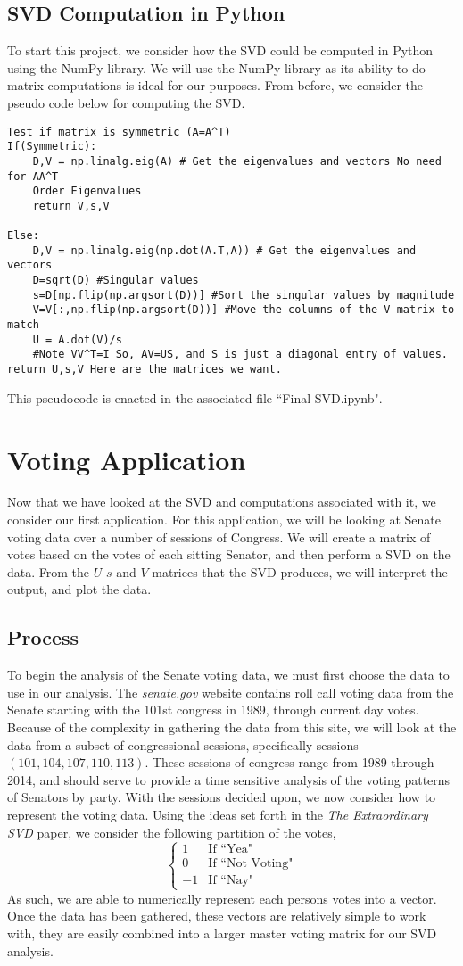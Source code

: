 \documentclass[letterpaper,12pt]{article}
\begin{document}
\subsection{SVD Computation in Python}
To start this project, we consider how the SVD could be computed in Python using the NumPy library. We will use the NumPy library as its ability to do matrix computations is ideal for our purposes. From before, we consider the pseudo code below for computing the SVD.
\begin{verbatim}
Test if matrix is symmetric (A=A^T)
If(Symmetric):
    D,V = np.linalg.eig(A) # Get the eigenvalues and vectors No need for AA^T
    Order Eigenvalues
    return V,s,V
	
Else:
    D,V = np.linalg.eig(np.dot(A.T,A)) # Get the eigenvalues and vectors
    D=sqrt(D) #Singular values
    s=D[np.flip(np.argsort(D))] #Sort the singular values by magnitude
    V=V[:,np.flip(np.argsort(D))] #Move the columns of the V matrix to match
    U = A.dot(V)/s 
    #Note VV^T=I So, AV=US, and S is just a diagonal entry of values.
return U,s,V Here are the matrices we want.
\end{verbatim}
This pseudocode is enacted in the associated file ``Final SVD.ipynb".
\section{Voting Application}
Now that we have looked at the SVD and computations associated with it, we consider our first application. For this application, we will be looking at Senate voting data over a number of sessions of Congress. We will create a matrix of votes based on the votes of each sitting Senator, and then perform a SVD on the data. From the $U$ $s$ and $V$ matrices that the SVD produces, we will interpret the output, and plot the data.
\subsection{Process}
To begin the analysis of the Senate voting data, we must first choose the data to use in our analysis. The \textit{senate.gov} website contains roll call voting data from the Senate starting with the 101st congress in 1989, through current day votes. Because of the complexity in gathering the data from this site, we will look at the data from a subset of congressional sessions, specifically sessions $(101,104,107,110,113)$. These sessions of congress range from 1989 through 2014, and should serve to provide a time sensitive analysis of the voting patterns of Senators by party.  With the sessions decided upon, we now consider how to represent the voting data. Using the ideas set forth in the \textit{The Extraordinary SVD} paper, we consider the following partition of the votes,
\[\begin{cases}
1 & \text{If ``Yea"}\\
0 & \text{If ``Not Voting"}\\
-1 & \text{If ``Nay"}
\end{cases}\]
As such, we are able to numerically represent each persons votes into a vector. Once the data has been gathered, these vectors are relatively simple to work with, they are easily combined into a larger master voting matrix for our SVD analysis.
\end{document}
